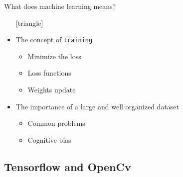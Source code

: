 \documentclass{beamer}
\begin{document}
\begin{frame}{What does machine learning means?}

  \begin{itemize}
\setlength\itemsep{1em}
[triangle]
  \item The concept of \texttt{training}
    \begin{itemize}
[circle]
    \item
      Minimize the loss
    \item    
      Loss functions
   \item
      Weights update
    \end{itemize}
  \item
    The importance of a large and well organized dataset
    \begin{itemize}
[circle]
    \item Common problems
    \item Cognitive bias
    \end{itemize}
  \end{itemize}
\end{frame}


\subsection{Tensorflow and OpenCv}
\end{document}
